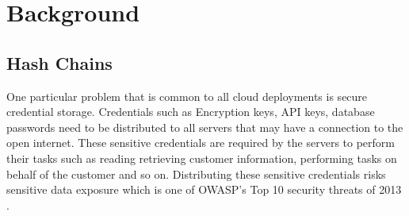 \documentclass{sig-alternate-05-2015}
\begin{document}
\section*{Background}
% 
% 
% 
% 
% 

\subsection*{Hash Chains \cite{horne_hash_2011}}

One particular problem that is common to all cloud deployments is secure credential storage. Credentials such as Encryption keys, API keys, database passwords need to be distributed to all servers that may have a connection to the open internet. These sensitive credentials are required by the servers to perform their tasks such as reading retrieving customer information, performing tasks on behalf of the customer and so on. Distributing these sensitive credentials risks sensitive data exposure which is one of OWASP's Top 10 security threats of 2013 \cite{wichers_owasp_2014}.
\end{document}
